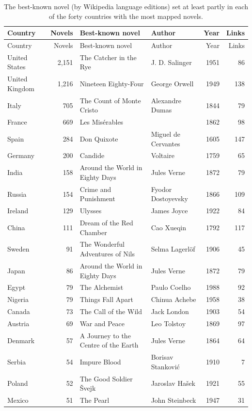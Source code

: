 \documentclass[11pt,a4paper]{article}
\begin{document}
{\footnotesize\setlength{\tabcolsep}{4pt}\begin{longtable}{lrp{5.2cm}p{3.6cm}rr}\caption{The best-known novel (by Wikipedia language editions) set at least partly in each of the forty countries with the most mapped novels.}\label{tab:famous}\\\toprule Country & Novels & Best-known novel & Author & Year & Links\\\midrule\endfirsthead\toprule Country & Novels & Best-known novel & Author & Year & Links\\\midrule\endhead
United States & 2,151 & The Catcher in the Rye & J. D. Salinger & 1951 & 86\\
United Kingdom & 1,216 & Nineteen Eighty-Four & George Orwell & 1949 & 138\\
Italy & 705 & The Count of Monte Cristo & Alexandre Dumas & 1844 & 79\\
France & 669 & Les Misérables &  & 1862 & 98\\
Spain & 284 & Don Quixote & Miguel de Cervantes & 1605 & 147\\
Germany & 200 & Candide & Voltaire & 1759 & 65\\
India & 158 & Around the World in Eighty Days & Jules Verne & 1872 & 79\\
Russia & 154 & Crime and Punishment & Fyodor Dostoyevsky & 1866 & 109\\
Ireland & 129 & Ulysses & James Joyce & 1922 & 84\\
China & 111 & Dream of the Red Chamber & Cao Xueqin & 1792 & 117\\
Sweden & 91 & The Wonderful Adventures of Nils & Selma Lagerlöf & 1906 & 45\\
Japan & 86 & Around the World in Eighty Days & Jules Verne & 1872 & 79\\
Egypt & 79 & The Alchemist & Paulo Coelho & 1988 & 92\\
Nigeria & 79 & Things Fall Apart & Chinua Achebe & 1958 & 38\\
Canada & 73 & The Call of the Wild & Jack London & 1903 & 54\\
Austria & 69 & War and Peace & Leo Tolstoy & 1869 & 97\\
Denmark & 57 & A Journey to the Centre of the Earth & Jules Verne & 1864 & 64\\
Serbia & 54 & Impure Blood & Borisav Stanković & 1910 & 7\\
Poland & 52 & The Good Soldier Švejk & Jaroslav Hašek & 1921 & 55\\
Mexico & 51 & The Pearl & John Steinbeck & 1947 & 31\\

\end{longtable}}
\end{document}
